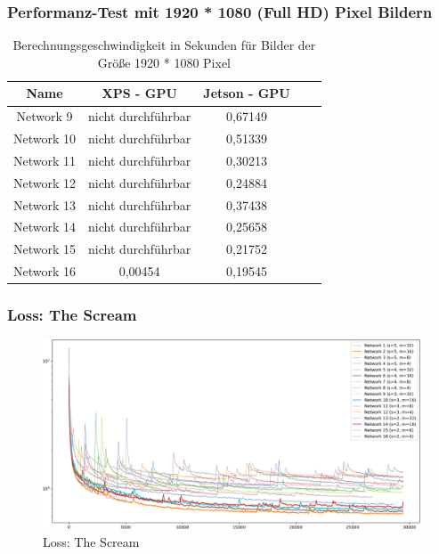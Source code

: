  \begin{frame}
    \frametitle{Performanz-Test mit 1920 * 1080 (Full HD) Pixel Bildern}

   \begin{table}[H]
       \centering
       \begin{tabular}{ |c|c|c|c|c| }
           \hline
           \textbf{Name} & \textbf{XPS - GPU} & \textbf{Jetson - GPU}   \\ \hline
           Network  9 & \textcolor{danger}{nicht durchführbar} & 0,67149                                \\ \hline
           Network 10 & \textcolor{danger}{nicht durchführbar} & 0,51339                                \\ \hline
           Network 11 & \textcolor{danger}{nicht durchführbar} & 0,30213                                \\ \hline
           Network 12 & \textcolor{danger}{nicht durchführbar} & 0,24884                                \\ \hline
           Network 13 & \textcolor{danger}{nicht durchführbar} & 0,37438                                \\ \hline
           Network 14 & \textcolor{danger}{nicht durchführbar} & 0,25658                                \\ \hline
           Network 15 & \textcolor{danger}{nicht durchführbar} & 0,21752                                \\ \hline
           Network 16 & 0,00454                                & 0,19545                                \\ \hline
       \end{tabular}
       \caption{Berechnungsgeschwindigkeit in Sekunden für Bilder der Größe 1920 * 1080 Pixel}
       \label{tab:1920x1080}
   \end{table}
\end{frame}

\begin{frame}
    \frametitle{Loss: The Scream}

    \begin{figure}[H]
        \centering
        \includegraphics[width=1.00\textwidth]{resources/content/experiments/fast_loss_plot_experiment2.jpg}
        \caption{Loss: The Scream}
        \label{img:results_the_scream}
    \end{figure}    
\end{frame}